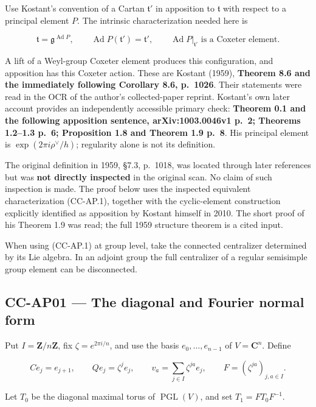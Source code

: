 Use Kostant's convention of a Cartan \(\mathfrak t'\) in apposition to
\(\mathfrak t\) with respect to a principal element \(P\). The intrinsic
characterization needed here is

\[
 \mathfrak t=\mathfrak g^{\operatorname{Ad}P},
 \qquad
 \operatorname{Ad}P(\mathfrak t')=\mathfrak t',
 \qquad
 \operatorname{Ad}P|_{\mathfrak t'}\text{ is a Coxeter element}.
 \tag{CC-AP.1}
\]

A lift of a Weyl-group Coxeter element produces this configuration, and
apposition has this Coxeter action. These are Kostant (1959),
\textbf{Theorem 8.6 and the immediately following Corollary 8.6,
p.~1026}. Their statements were read in the OCR of the author's
collected-paper reprint. Kostant's own later account provides an
independently accessible primary check: \textbf{Theorem 0.1 and the
following apposition sentence, arXiv:1003.0046v1 p.~2; Theorems 1.2--1.3
p.~6; Proposition 1.8 and Theorem 1.9 p.~8}. His principal element is
\(\exp(2\pi i\rho^\vee/h)\); regularity alone is not its definition.

The original definition in 1959, §7.3, p.~1018, was located through
later references but was \textbf{not directly inspected} in the original
scan. No claim of such inspection is made. The proof below uses the
inspected equivalent characterization (CC-AP.1), together with the
cyclic-element construction explicitly identified as apposition by
Kostant himself in 2010. The short proof of his Theorem 1.9 was read;
the full 1959 structure theorem is a cited input.

When using (CC-AP.1) at group level, take the connected centralizer
determined by its Lie algebra. In an adjoint group the full centralizer
of a regular semisimple group element can be disconnected.

\subsection{CC-AP01 --- The diagonal and Fourier normal
form}\label{cc-ap01-the-diagonal-and-fourier-normal-form}

Put \(I=\mathbf Z/n\mathbf Z\), fix \(\zeta=e^{2\pi i/n}\), and use the
basis \(e_0,\ldots,e_{n-1}\) of \(V=\mathbf C^n\). Define

\[
 C e_j=e_{j+1},\qquad
 Qe_j=\zeta^j e_j,\qquad
 v_a=\sum_{j\in I}\zeta^{ja}e_j,
 \qquad F=(\zeta^{ja})_{j,a\in I}.
\]

Let \(T_0\) be the diagonal maximal torus of \(\operatorname{PGL}(V)\),
and set \(T_1=FT_0F^{-1}\).

